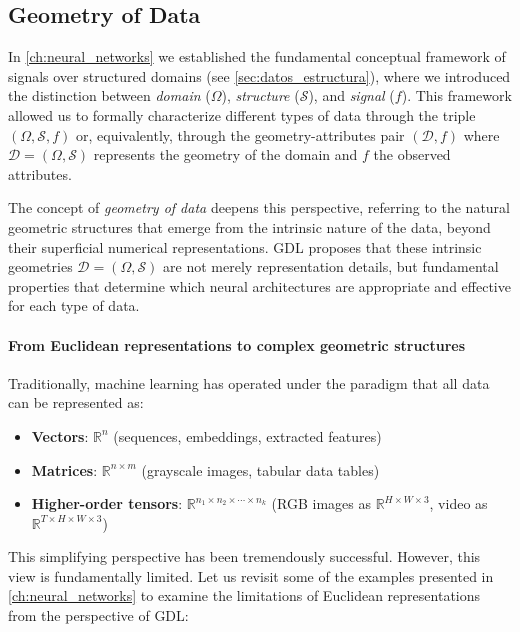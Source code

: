 \subsection{Geometry of Data}\label{subsec:geometria_datos}

In \autoref{ch:neural_networks} we established the fundamental conceptual framework of signals over structured domains (see \autoref{sec:datos_estructura}), where we introduced the distinction between \textit{domain} ($\Omega$), \textit{structure} ($\mathcal{S}$), and \textit{signal} ($f$). This framework allowed us to formally characterize different types of data through the triple $(\Omega, \mathcal{S}, f)$ or, equivalently, through the geometry-attributes pair $(\mathcal{D}, f)$ where $\mathcal{D} = (\Omega, \mathcal{S})$ represents the geometry of the domain and $f$ the observed attributes.

The concept of \textit{geometry of data} deepens this perspective, referring to the natural geometric structures that emerge from the intrinsic nature of the data, beyond their superficial numerical representations. \gls{GDL} proposes that these intrinsic geometries $\mathcal{D} = (\Omega, \mathcal{S})$ are not merely representation details, but fundamental properties that determine which neural architectures are appropriate and effective for each type of data.

\paragraph{From Euclidean representations to complex geometric structures}

Traditionally, machine learning has operated under the paradigm that all data can be represented as:

\begin{itemize}
    \item \textbf{Vectors}: $\mathbb{R}^n$ (sequences, embeddings, extracted features)
    \item \textbf{Matrices}: $\mathbb{R}^{n \times m}$ (grayscale images, tabular data tables)
    \item \textbf{Higher-order tensors}: $\mathbb{R}^{n_1 \times n_2 \times \cdots \times n_k}$ (RGB images as $\mathbb{R}^{H \times W \times 3}$, video as $\mathbb{R}^{T \times H \times W \times 3}$)
\end{itemize}

This simplifying perspective has been tremendously successful. However, this view is fundamentally limited. Let us revisit some of the examples presented in \autoref{ch:neural_networks} to examine the limitations of Euclidean representations from the perspective of \gls{GDL}:

